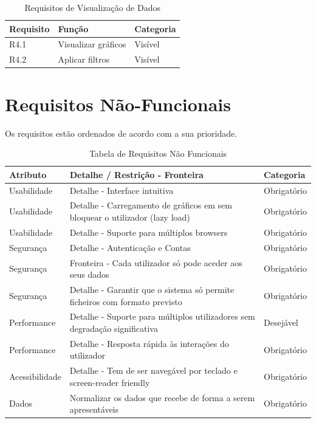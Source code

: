 \begin{table}[h!]
\centering
\begin{tabular}{|l|p{7cm}|l|}
\hline
\textbf{Requisito} & \textbf{Função} & \textbf{Categoria} \\
\hline
R4.1 & Visualizar gráficos & Visível \\
R4.2 & Aplicar filtros & Visível \\
\hline
\end{tabular}
\caption{Requisitos de Visualização de Dados}
\label{tab:requisitosVisualizacao}
\end{table}

\section{Requisitos Não-Funcionais}
Os requisitos estão ordenados de acordo com a sua prioridade.
\begin{table}[h!]
    \centering
    \begin{tabular}{|l|p{7cm}|l|}
    \hline
    \textbf{Atributo} & \textbf{Detalhe / Restrição - Fronteira} & \textbf{Categoria} \\
    \hline
    Usabilidade & Detalhe - Interface intuitiva & Obrigatório \\
    Usabilidade & Detalhe - Carregamento de gráficos em sem bloquear o utilizador (lazy load) & Obrigatório \\
    Usabilidade & Detalhe - Suporte para múltiplos browsers & Obrigatório \\
    Segurança & Detalhe - Autenticação e Contas & Obrigatório \\
    Segurança & Fronteira - Cada utilizador só pode aceder aos seus dados & Obrigatório \\
    Segurança & Detalhe - Garantir que o sistema só permite ficheiros com formato previsto & Obrigatório \\
    Performance & Detalhe - Suporte para múltiplos utilizadores sem degradação significativa & Desejável \\
    Performance & Detalhe - Resposta rápida às interações do utilizador & Obrigatório \\
    Acessibilidade & Detalhe - Tem de ser navegável por teclado e screen-reader friendly & Obrigatório \\
    Dados & Normalizar os dados que recebe de forma a serem apresentáveis & Obrigatório \\

    \hline
    \end{tabular}
    \caption{Tabela de Requisitos Não Funcionais}
    \label{tab:requisitosNaofuncionais}
    \end{table}
    

